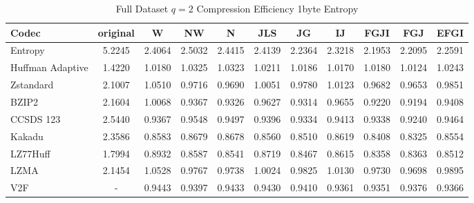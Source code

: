 \documentclass{article}
\begin{document}
\begin{table}[h!]
\centering
\caption{Full Dataset $q=2$ Compression Efficiency 1byte Entropy}
\begin{tabular}{|l|cccccccccc|}
\hline
Codec &  original &      W &     NW &      N &    JLS &     JG &     IJ &   FGJI &    FGJ &   EFGI \\
\hline
Entropy & 5.2245 & 2.4064 & 2.5032 & 2.4415 & 2.4139 & 2.2364 & 2.3218 & 2.1953 & 2.2095 & 2.2591 \\
\hline
Huffman Adaptive &    1.4220 & 1.0180 & 1.0325 & 1.0323 & 1.0211 & 1.0186 & 1.0170 & 1.0180 & 1.0124 & 1.0243 \\
Zstandard        &    2.1007 & 1.0510 & 0.9716 & 0.9690 & 1.0051 & 0.9780 & 1.0123 & 0.9682 & 0.9653 & 0.9851 \\
BZIP2            &    2.1604 & 1.0068 & 0.9367 & 0.9326 & 0.9627 & 0.9314 & 0.9655 & 0.9220 & 0.9194 & 0.9408 \\
CCSDS 123        &    2.5440 & 0.9367 & 0.9548 & 0.9497 & 0.9396 & 0.9334 & 0.9413 & 0.9338 & 0.9240 & 0.9464 \\
Kakadu           &    2.3586 & 0.8583 & 0.8679 & 0.8678 & 0.8560 & 0.8510 & 0.8619 & 0.8408 & 0.8325 & 0.8554 \\
LZ77Huff         &    1.7994 & 0.8932 & 0.8587 & 0.8541 & 0.8719 & 0.8467 & 0.8615 & 0.8358 & 0.8363 & 0.8512 \\
LZMA             &    2.1454 & 1.0528 & 0.9767 & 0.9738 & 1.0024 & 0.9825 & 1.0130 & 0.9730 & 0.9698 & 0.9895 \\
V2F              &    - & 0.9443 & 0.9397 & 0.9433 & 0.9430 & 0.9410 & 0.9361 & 0.9351 & 0.9376 & 0.9366 \\
\hline
\end{tabular}
\end{table}
\end{document}
